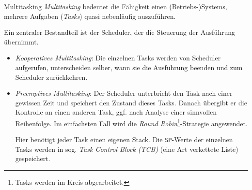 \begin{defi}{Multitasking}
    \emph{Multitasking} bedeutet die Fähigkeit einen (Betriebs-)Systems, mehrere Aufgaben (\emph{Tasks}) quasi nebenläufig auszuführen.

    Ein zentraler Bestandteil ist der Scheduler, der die Steuerung der Ausführung übernimmt.

    \begin{itemize}
        \item \emph{Kooperatives Multitasking}: Die einzelnen Tasks werden von Scheduler aufgerufen, unterscheiden selber, wann sie die Ausführung beenden und zum Scheduler zurückkehren.
        \item \emph{Preemptives Multitasking}: Der Scheduler unterbricht den Task nach einer gewissen Zeit und speichert den Zustand dieses Tasks.
              Danach übergibt er die Kontrolle an einen anderen Task, ggf. nach Analyse einer sinnvollen Reihenfolge.
              Im einfachsten Fall wird die \emph{Round Robin}\footnote{Tasks werden im Kreis abgearbeitet.}-Strategie angewendet.

              Hier benötigt jeder Task einen eigenen Stack.
              Die \texttt{SP}-Werte der einzelnen Tasks werden in sog. \emph{Task Control Block (TCB)} (eine Art verkettete Liste) gespeichert.
    \end{itemize}
\end{defi}